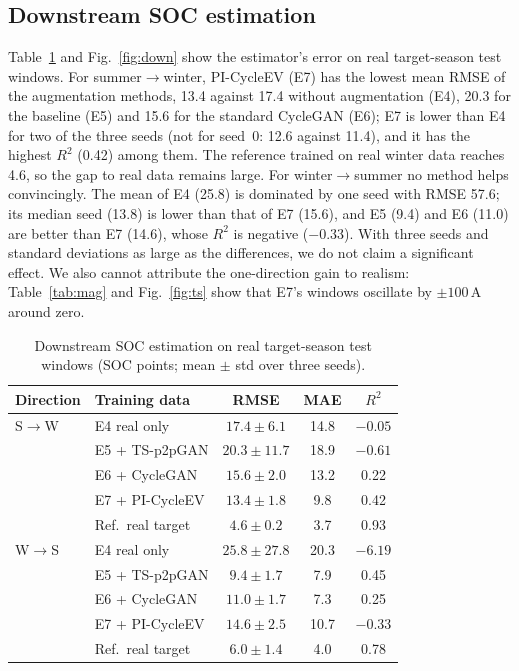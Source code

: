 \documentclass[conference]{IEEEtran}
\begin{document}
\subsection{Downstream SOC estimation}
Table~\ref{tab:down} and Fig.~\ref{fig:down} show the estimator's error on real target-season test windows. For summer$\rightarrow$winter, PI-CycleEV (E7) has the lowest mean RMSE of the augmentation methods, 13.4 against 17.4 without augmentation (E4), 20.3 for the baseline (E5) and 15.6 for the standard CycleGAN (E6); E7 is lower than E4 for two of the three seeds (not for seed~0: 12.6 against 11.4), and it has the highest $R^2$ (0.42) among them. The reference trained on real winter data reaches 4.6, so the gap to real data remains large. For winter$\rightarrow$summer no method helps convincingly. The mean of E4 (25.8) is dominated by one seed with RMSE 57.6; its median seed (13.8) is lower than that of E7 (15.6), and E5 (9.4) and E6 (11.0) are better than E7 (14.6), whose $R^2$ is negative ($-0.33$). With three seeds and standard deviations as large as the differences, we do not claim a significant effect. We also cannot attribute the one-direction gain to realism: Table~\ref{tab:mag} and Fig.~\ref{fig:ts} show that E7's windows oscillate by $\pm100$\,A around zero.

\begin{table}[t]
\caption{Downstream SOC estimation on real target-season test windows (SOC points; mean $\pm$ std over three seeds).}
\label{tab:down}
\centering\small
\setlength{\tabcolsep}{3pt}
\begin{tabular}{llccc}
\toprule
Direction & Training data & RMSE & MAE & $R^2$\\
\midrule
S$\rightarrow$W & E4 real only & $17.4\pm6.1$ & 14.8 & $-0.05$\\
 & E5 + TS-p2pGAN & $20.3\pm11.7$ & 18.9 & $-0.61$\\
 & E6 + CycleGAN & $15.6\pm2.0$ & 13.2 & 0.22\\
 & E7 + PI-CycleEV & $13.4\pm1.8$ & 9.8 & 0.42\\
 & Ref.\ real target & $4.6\pm0.2$ & 3.7 & 0.93\\
\midrule
W$\rightarrow$S & E4 real only & $25.8\pm27.8$ & 20.3 & $-6.19$\\
 & E5 + TS-p2pGAN & $9.4\pm1.7$ & 7.9 & 0.45\\
 & E6 + CycleGAN & $11.0\pm1.7$ & 7.3 & 0.25\\
 & E7 + PI-CycleEV & $14.6\pm2.5$ & 10.7 & $-0.33$\\
 & Ref.\ real target & $6.0\pm1.4$ & 4.0 & 0.78\\
\bottomrule
\end{tabular}
\end{table}
\end{document}
